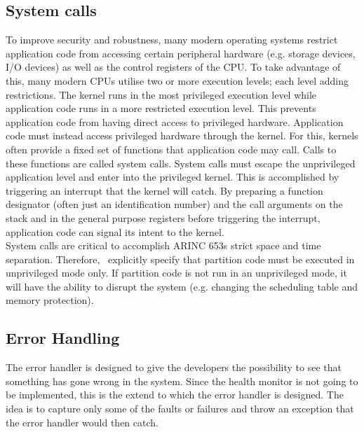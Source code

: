 \subsection{System calls}
\label{ssec:design_system_calls}
To improve security and robustness, many modern operating systems restrict
application code from accessing certain peripheral hardware (e.g. storage
devices, I/O devices) as well as the control registers of the CPU.
To take advantage of this, many modern CPUs utilise two or more execution levels; each
level adding restrictions. The kernel runs in the most privileged execution
level while application code runs in a more restricted execution level. This
prevents application code from having direct access to privileged hardware.
Application code must instead access privileged hardware through the kernel. For
this, kernels often provide a fixed set of functions that application code may
call. Calls to these functions are called system calls. System calls must escape
the unprivileged application level and enter into the privileged kernel. This is
accomplished by triggering an interrupt that the kernel will catch. By preparing
a function designator (often just an identification number) and the call arguments
on the stack and in the general purpose registers before triggering the
interrupt, application code can signal its intent to the kernel.\\

System calls are critical to accomplish ARINC 653\textquotesingle{}s strict
space and time separation. Therefore, \arinc\ explicitly specify that partition
code must be executed in unprivileged mode only\cite{arinc_page_18}. If
partition code is not run in an unprivileged mode, it will
have the ability to disrupt the system (e.g. changing the scheduling table and memory protection).


\subsection{Error Handling}
The error handler is designed to give the developers the possibility
to see that something has gone wrong in the system.
Since the health monitor is not going to be implemented,
this is the extend to which the error handler is designed.
The idea is to capture only
some of the faults or failures and throw an exception that the error
handler would then catch.



